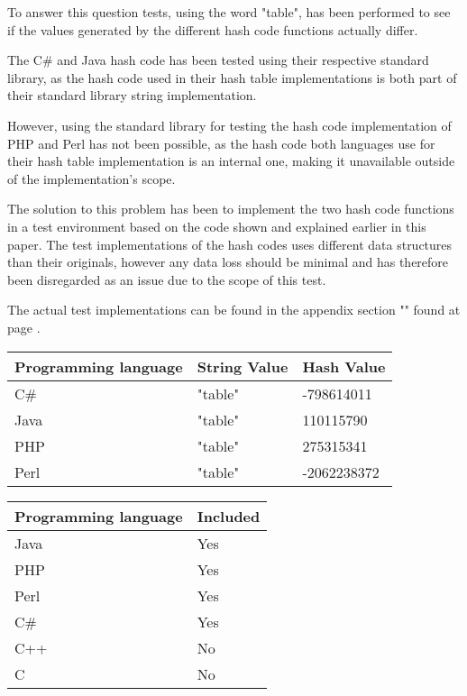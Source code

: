 \documentclass[titlepage]{article}
\begin{document}
To answer this question tests, using the word "table", has been performed to see if the values generated by the different hash code functions actually differ.

The C\# and Java hash code has been tested using their respective standard library, as the hash code used in their hash table implementations is both part of their standard library string implementation.

However, using the standard library for testing the hash code implementation of PHP and Perl has not been possible, as the hash code both languages use for their hash table implementation is an internal one, making it unavailable outside of the implementation's scope.

The solution to this problem has been to implement the two hash code functions in a test environment based on the code shown and explained earlier in this paper. The test implementations of the hash codes uses different data structures than their originals, however any data loss should be minimal and has therefore been disregarded as an issue due to the scope of this test. 

The actual test implementations can be found in the appendix section "" found at page \pageref{appen:HashCodeTest}.

\begin{minipage}{\linewidth}
	\centering
			\bigskip
	\begin{tabular}{| l | l | l |}
		\hline
		\textbf{Programming language} & \textbf{String Value} & \textbf{Hash Value} \\ \hline
		C\# & "table" & -798614011 \\ \hline
		Java & "table" & 110115790 \\ \hline
		PHP & "table" & 275315341 \\ \hline
		Perl & "table" & -2062238372 \\ \hline
		
	\end{tabular}\par
			 \label{tab:title} 
			\bigskip
	\end{minipage}
	
	



\begin{tabular}{| l | l |}
	\hline
	 \textbf{Programming language} & \textbf{Included} \\ \hline
	 Java & Yes \\ \hline
	 PHP & Yes \\ \hline
	 Perl & Yes \\ \hline
	 C\# & Yes \\ \hline
	 C++ & No \\ \hline
	 C & No \\ \hline
\end{tabular}
\end{document}
